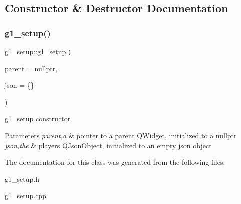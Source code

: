 \subsection{Constructor \& Destructor Documentation}
\mbox{\label{classg1__setup_a3ccf5f574bca392284f9c3ae58612162}} 
\subsubsection{\texorpdfstring{g1\+\_\+setup()}{g1\_setup()}}
{\footnotesize\ttfamily g1\+\_\+setup\+::g1\+\_\+setup (\begin{DoxyParamCaption}\item[{Q\+Widget $\ast$}]{parent = {\ttfamily nullptr},  }\item[{Q\+Json\+Object}]{json = {\ttfamily \{\}} }\end{DoxyParamCaption})\hspace{0.3cm}{\ttfamily [explicit]}}



\hyperlink{classg1__setup}{g1\+\_\+setup} constructor 


\begin{DoxyParams}{Parameters}
{\em parent,a} & pointer to a parent Q\+Widget, initialized to a nullptr \\
\hline
{\em json,the} & player\textquotesingle{}s Q\+Json\+Object, initialized to an empty json object \\
\hline
\end{DoxyParams}


The documentation for this class was generated from the following files\+:\begin{DoxyCompactItemize}
\item 
g1\+\_\+setup.\+h\item 
g1\+\_\+setup.\+cpp\end{DoxyCompactItemize}
